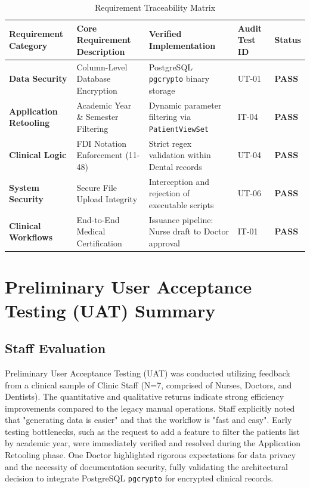 \begin{table}[htbp]
\centering
\caption{Requirement Traceability Matrix}
\begin{tabular}{|p{}|p{}|p{}|p{}|p{}|}
\hline
\textbf{Requirement Category} & \textbf{Core Requirement Description} & \textbf{Verified Implementation} & \textbf{Audit Test ID} & \textbf{Status} \\
\hline
\textbf{Data Security} & Column-Level Database Encryption & PostgreSQL \texttt{pgcrypto} binary storage & UT-01 & \textbf{PASS} \\
\hline
\textbf{Application Retooling} & Academic Year \& Semester Filtering & Dynamic parameter filtering via \texttt{PatientViewSet} & IT-04 & \textbf{PASS} \\
\hline
\textbf{Clinical Logic} & FDI Notation Enforcement (11-48) & Strict regex validation within Dental records & UT-04 & \textbf{PASS} \\
\hline
\textbf{System Security} & Secure File Upload Integrity & Interception and rejection of executable scripts & UT-06 & \textbf{PASS} \\
\hline
\textbf{Clinical Workflows} & End-to-End Medical Certification & Issuance pipeline: Nurse draft to Doctor approval & IT-01 & \textbf{PASS} \\
\hline
\end{tabular}
\end{table}

\section{Preliminary User Acceptance Testing (UAT) Summary}

\subsection{Staff Evaluation}
Preliminary User Acceptance Testing (UAT) was conducted utilizing feedback from a clinical sample of Clinic Staff (N=7, comprised of Nurses, Doctors, and Dentists). The quantitative and qualitative returns indicate strong efficiency improvements compared to the legacy manual operations. Staff explicitly noted that "generating data is easier" and that the workflow is "fast and easy". Early testing bottlenecks, such as the request to add a feature to filter the patients list by academic year, were immediately verified and resolved during the Application Retooling phase. One Doctor highlighted rigorous expectations for data privacy and the necessity of documentation security, fully validating the architectural decision to integrate PostgreSQL \texttt{pgcrypto} for encrypted clinical records.


